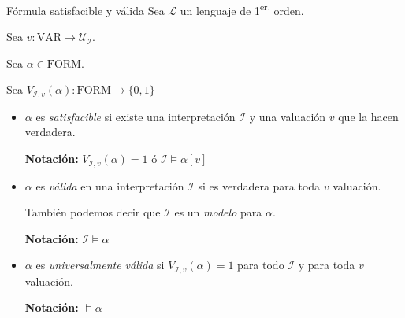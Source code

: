 \begin{definicion}{Fórmula satisfacible y válida}{}
    Sea $\mathcal{L}$ un lenguaje de 1\textsuperscript{er.} orden.

    Sea $v: \mathrm{VAR} \to \mathcal{U}_{\mathcal{I}}$.

    Sea $\alpha \in \mathrm{FORM}$.

    Sea $V_{\mathcal{I}, v}(\alpha): \mathrm{FORM} \to \{ 0,1 \}$
    \begin{itemize}
        \item $\alpha$ es \textit{satisfacible} si existe una interpretación 
            $\mathcal{I}$  y una valuación $v$ que la hacen verdadera.

            \bigskip
            \textbf{Notación:}
            $V_{\mathcal{I}, v}(\alpha) = 1$ ó $\mathcal{I} \vDash \alpha [v]$

        \item $\alpha$ es \textit{válida} en una interpretación
            $\mathcal{I}$ si es verdadera para
            toda $v$ valuación.

            También podemos decir que $\mathcal{I}$ es un \textit{modelo} 
            para $\alpha$.

            \bigskip
            \textbf{Notación:}
            $\mathcal{I} \vDash \alpha$

        \item $\alpha$ es \textit{universalmente válida} si 
            $V_{\mathcal{I}, v}(\alpha) = 1$ para todo $\mathcal{I}$ y para 
            toda $v$ valuación.

            \bigskip
            \textbf{Notación:}
            $\vDash \alpha$
    \end{itemize}
\end{definicion}

\medskip

